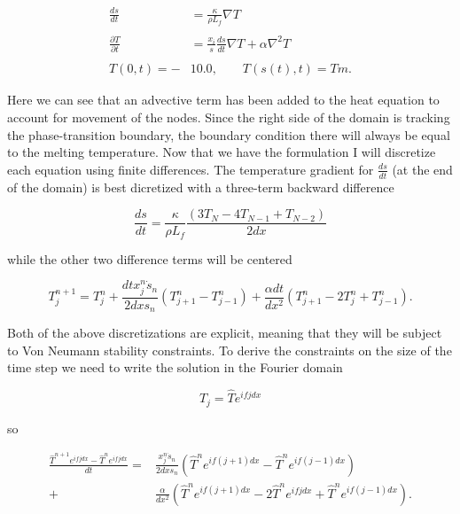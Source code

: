 \documentclass[12pt]{article}
\begin{document}
\begin{equation}
\begin{aligned}
\frac{ds}{dt} &= \frac{\kappa}{\rho L_f} \nabla T \\~\\
\frac{\partial T}{\partial t} &= \frac{x_i}{s} \frac{ds}{dt} \nabla T + \alpha \nabla^2 T \\~\\
T(0,t) = -&10.0, \hspace{2em} T(s(t),t) = Tm.
\end{aligned}
\end{equation}

Here we can see that an advective term has been added to the heat equation to account for movement of the nodes. Since the right side of the domain is tracking the phase-transition boundary, the boundary condition there will always be equal to the melting temperature. Now that we have the formulation I will discretize each equation using finite differences. The temperature gradient for $\frac{ds}{dt}$ (at the end of the domain) is best dicretized with a three-term backward difference \citep{Furzeland1980}

\begin{equation}
\frac{ds}{dt} = \frac{\kappa}{\rho L_f} \frac{(3T_N-4T_{N-1}+T_{N-2})}{2 dx}
\end{equation}

while the other two difference terms will be centered

\begin{equation}
T_j^{n+1} = T_j^n + \frac{dt x_j^n \dot{s}_n}{2dx s_n}
(T_{j+1}^n-T_{j-1}^n) +
\frac{\alpha dt}{dx^2}(T_{j+1}^n - 2T_{j}^n + T_{j-1}^n).
\end{equation}

Both of the above discretizations are explicit, meaning that they will be subject to Von Neumann stability constraints. To derive the constraints on the size of the time step we need to write the solution in the Fourier domain 

\begin{equation}
T_j = \hat{T}e^{ifjdx}
\end{equation}

so 

\begin{equation}
\begin{aligned}
\frac{\hat{T}^{n+1}e^{ifjdx} - \hat{T}^{n}e^{ifjdx}}{dt} = 
&\frac{x_j^n \dot{s}_n}{2dx s_n}
(\hat{T}^{n}e^{if(j+1)dx}-\hat{T}^{n}e^{if(j-1)dx}) \\
+ &\frac{\alpha}{dx^2} (\hat{T}^{n}e^{if(j+1)dx} - 2\hat{T}^{n}e^{ifjdx} + \hat{T}^{n}e^{if(j-1)dx}).
\end{aligned}
\end{equation}
\end{document}
